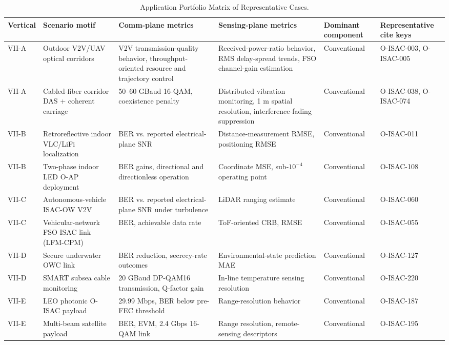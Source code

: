 \begin{table}[!t]
\caption{Application Portfolio Matrix of Representative Cases.}
\label{tab:app-portfolio}
\centering
\scriptsize
\setlength{\tabcolsep}{3pt}
\begin{tabular}{p{} p{} p{} p{} p{} p{}}
\toprule
Vertical & Scenario motif & Comm-plane metrics & Sensing-plane metrics & Dominant component & Representative cite keys \\
\midrule
VII-A & Outdoor V2V/UAV optical corridors & V2V transmission-quality behavior, throughput-oriented resource and trajectory control & Received-power-ratio behavior, RMS delay-spread trends, FSO channel-gain estimation & Conventional & O-ISAC-003, O-ISAC-005 \\
VII-A & Cabled-fiber corridor DAS + coherent carriage & 50--60 GBaud 16-QAM, coexistence penalty & Distributed vibration monitoring, 1 m spatial resolution, interference-fading suppression & Conventional & O-ISAC-038, O-ISAC-074 \\
VII-B & Retroreflective indoor VLC/LiFi localization & BER vs. reported electrical-plane SNR & Distance-measurement RMSE, positioning RMSE & Conventional & O-ISAC-011 \\
VII-B & Two-phase indoor LED O-AP deployment & BER gains, directional and directionless operation & Coordinate MSE, sub-$10^{-4}$ operating point & Conventional & O-ISAC-108 \\
VII-C & Autonomous-vehicle ISAC-OW V2V & BER vs. reported electrical-plane SNR under turbulence & LiDAR ranging estimate & Conventional & O-ISAC-060 \\
VII-C & Vehicular-network FSO ISAC link (LFM-CPM) & BER, achievable data rate & ToF-oriented CRB, RMSE & Conventional & O-ISAC-055 \\
VII-D & Secure underwater OWC link & BER reduction, secrecy-rate outcomes & Environmental-state prediction MAE & Conventional & O-ISAC-127 \\
VII-D & SMART subsea cable monitoring & 20 GBaud DP-QAM16 transmission, Q-factor gain & In-line temperature sensing resolution & Conventional & O-ISAC-220 \\
VII-E & LEO photonic O-ISAC payload & 29.99 Mbps, BER below pre-FEC threshold & Range-resolution behavior & Conventional & O-ISAC-187 \\
VII-E & Multi-beam satellite payload & BER, EVM, 2.4 Gbps 16-QAM link & Range resolution, remote-sensing descriptors & Conventional & O-ISAC-195 \\
\bottomrule
\end{tabular}
\end{table}

